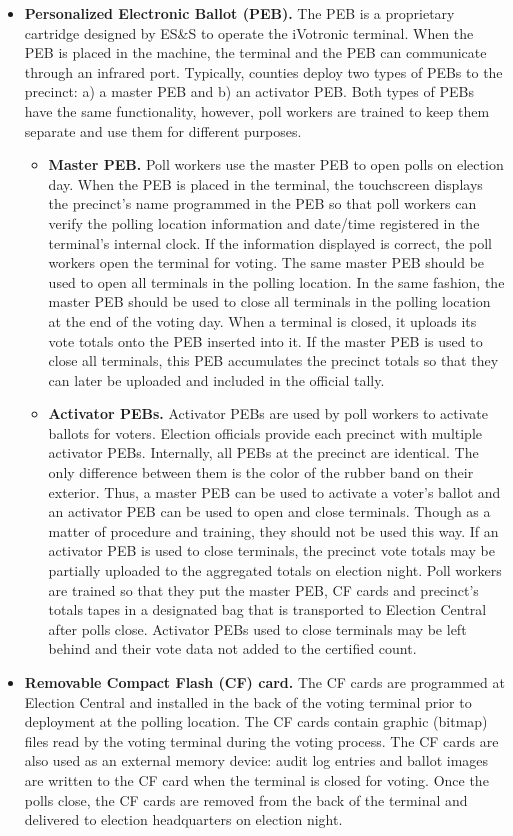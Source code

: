 \begin{itemize}
\item \textbf{Personalized Electronic Ballot (PEB).} The PEB is a proprietary cartridge designed by ES\&S to operate the iVotronic terminal.  When the PEB is placed in the machine, the terminal and the PEB can communicate through an infrared port.  Typically, counties deploy two types of PEBs to the precinct: a) a master PEB and b) an activator PEB. Both types of PEBs have the same functionality, however, poll workers are trained to keep them separate and use them for different purposes.
    \begin{itemize}
    \item \textbf{Master PEB.}  Poll workers use the master PEB to open polls on election day. When the PEB is placed in the terminal, the touchscreen displays the precinct's name programmed in the PEB so that poll workers can verify the polling location information and date/time registered in the terminal's internal clock. If the information displayed is correct, the poll workers open the terminal for voting. The same master PEB should be used to open all terminals in the polling location. In the same fashion, the master PEB should be used to close all terminals in the polling location at the end of the voting day. When a terminal is closed, it uploads its vote totals onto the PEB inserted into it. If the master PEB is used to close all terminals, this PEB accumulates the precinct totals so that they can later be uploaded and included in the official tally.
    \item \textbf{Activator PEBs.}  Activator PEBs are used by  poll workers to activate ballots for voters. Election officials provide each precinct with multiple activator PEBs. Internally, all PEBs at the precinct are identical. The only difference between them is the color of the rubber band on their exterior. Thus, a master PEB can be used to activate a voter's ballot and an activator PEB can be used to open and close terminals. Though as a matter of procedure and training, they should not be used this way. If an activator PEB is used to close terminals, the precinct vote totals may be partially uploaded to the aggregated totals on election night. Poll workers are trained so that they put the master PEB, CF cards and precinct's totals tapes in a designated bag that is transported to Election Central after polls close.  Activator PEBs used to close terminals may be left behind and their vote data not added to the certified count.
    \end{itemize}
\item \textbf{Removable Compact Flash (CF) card.} The CF cards are programmed at Election Central and installed in the back of the voting terminal prior to deployment at the polling location. The CF cards contain graphic (bitmap) files read by the voting terminal during the voting process. The CF cards are also used as an external memory device: audit log entries and ballot images are written to the CF card when the terminal is closed for voting. Once the polls close, the CF cards are removed from the back of the terminal and delivered to election headquarters on election night. 


\end{itemize}

